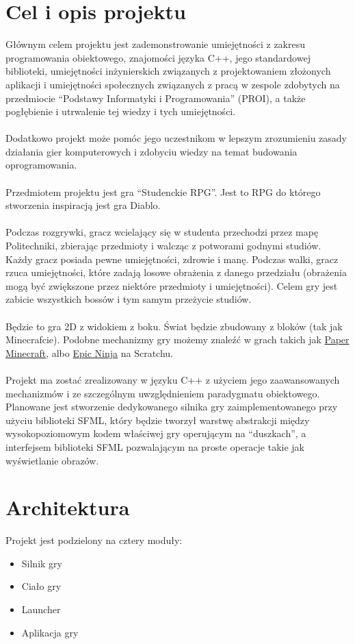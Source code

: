 \documentclass[12pt, titlepage]{article}
\begin{document}
\section{Cel i opis projektu}
Głównym celem projektu jest zademonstrowanie
umiejętności z zakresu programowania
obiektowego, znajomości języka C++,
jego standardowej biblioteki, umiejętności
inżynierskich związanych z projektowaniem
złożonych aplikacji i umiejętności społecznych
związanych z pracą w zespole zdobytych na
przedmiocie "`Podstawy Informatyki i Programowania"'
(PROI), a także pogłębienie i utrwalenie
tej wiedzy i tych umiejętności. 
\\~\\
Dodatkowo projekt może pomóc jego uczestnikom w
lepszym zrozumieniu zasady działania gier
komputerowych i zdobyciu wiedzy na temat budowania
oprogramowania.
\\~\\
Przedmiotem projektu jest gra "`Studenckie RPG"'.
Jest to RPG do którego stworzenia inspiracją
jest gra Diablo.
\\~\\
Podczas rozgrywki, gracz
wcielający się w studenta przechodzi
przez mapę Politechniki, zbierając przedmioty i
walcząc z potworami godnymi studiów. Każdy gracz
posiada pewne umiejętności, zdrowie i manę.
Podczas walki, gracz rzuca umiejętności, które
zadają losowe obrażenia z danego przedziału
(obrażenia mogą być zwiększone przez niektóre
przedmioty i umiejętności). Celem gry jest zabicie
wszystkich bossów i tym samym przeżycie studiów.
\\~\\
Będzie to gra 2D z widokiem z boku. Świat będzie
zbudowany z bloków (tak jak Minecrafcie). Podobne
mechanizmy gry możemy znaleźć w grach takich jak
\href{https://scratch.mit.edu/projects/10128407/}{Paper Minecraft},
albo \href{https://scratch.mit.edu/projects/21554369/}{Epic Ninja} na Scratchu.
\\~\\
Projekt ma zostać zrealizowany w języku C++ z użyciem
jego zaawansowanych mechanizmów i ze szczególnym
uwzględnieniem paradygmatu obiektowego. Planowane
jest stworzenie dedykowanego silnika gry
zaimplementowanego przy użyciu biblioteki SFML, który
będzie tworzył warstwę abstrakcji między wysokopoziomowym
kodem właściwej gry operującym na "`duszkach"', a
interfejsem biblioteki SFML pozwalającym na
proste operacje takie jak wyświetlanie obrazów.

\newpage
\section{Architektura}
Projekt jest podzielony na cztery moduły:
\begin{itemize}
	\item Silnik gry
	\item Ciało gry
	\item Launcher
	\item Aplikacja gry
\end{itemize}
\end{document}
